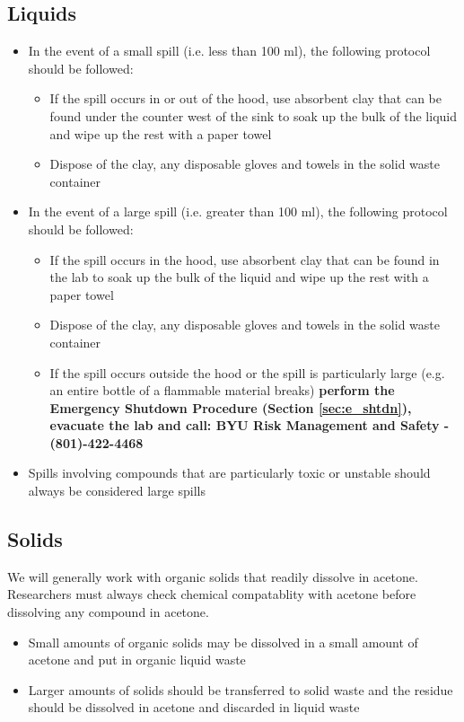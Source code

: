 \documentclass[letterpaper,11pt]{article}
\begin{document}
    \subsection{Liquids}
    \begin{itemize}
    
    \item In the event of a small spill (i.e. less than 100 ml), the following 
        protocol should be followed:
        \begin{itemize}
        \item If the spill occurs in or out of the hood, use absorbent clay that
            can be found under the counter west of the sink to soak up the 
            bulk of the liquid and wipe up the rest with a paper towel
        \item Dispose of the clay, any disposable gloves and towels in the solid 
            waste container
        \end{itemize}    
    \item In the event of a large spill (i.e. greater than 100 ml), the 
        following protocol should be followed:
        \begin{itemize}
        \item If the spill occurs in the hood, use absorbent clay that can be 
            found in the lab to soak up the bulk of the liquid and wipe up the 
            rest with a paper towel
        \item Dispose of the clay, any disposable gloves and towels in the solid 
            waste container
        \item If the spill occurs outside the hood or the spill is particularly 
            large (e.g. an entire bottle of a flammable material breaks) 
            \textbf{perform the Emergency Shutdown Procedure (Section 
            \ref{sec:e_shtdn}), evacuate the lab and call: BYU Risk Management 
            and Safety - (801)-422-4468} 
        \end{itemize}
    
    \item Spills involving compounds that are particularly toxic or unstable 
        should always be considered large spills
    
    \end{itemize}

    \subsection{Solids} \label{sec:spill_solid}
    We will generally work with organic solids that readily dissolve
    in acetone. Researchers must always check chemical compatablity with acetone
    before dissolving any compound in acetone.
    \begin{itemize}
    \item Small amounts of organic solids may be dissolved in a small amount of 
        acetone and put in organic liquid waste
    \item Larger amounts of solids should be transferred to solid waste and the
        residue should be dissolved in acetone and discarded in liquid waste
    \end{itemize}
\end{document}
